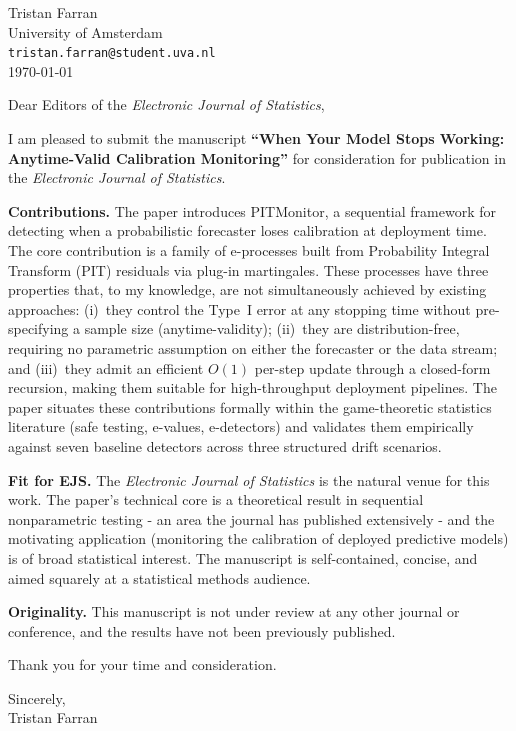 \documentclass[11pt]{article}
\begin{document}
\begin{flushright}
Tristan Farran\\
University of Amsterdam\\
\texttt{tristan.farran@student.uva.nl}\\[6pt]
\today
\end{flushright}

\bigskip

Dear Editors of the \textit{Electronic Journal of Statistics},

\bigskip

I am pleased to submit the manuscript \textbf{``When Your Model Stops Working: Anytime-Valid Calibration Monitoring''} for consideration for publication in the \textit{Electronic Journal of Statistics}.

\medskip
\textbf{Contributions.} The paper introduces PITMonitor, a sequential framework for detecting when a probabilistic forecaster loses calibration at deployment time. The core contribution is a family of e-processes built from Probability Integral Transform (PIT) residuals via plug-in martingales. These processes have three properties that, to my knowledge, are not simultaneously achieved
by existing approaches: (i)~they control the Type~I error at any stopping time without pre-specifying a sample size (anytime-validity); (ii)~they are distribution-free, requiring no parametric assumption on either the forecaster or the data stream; and (iii)~they admit an efficient $O(1)$ per-step update through a closed-form recursion, making them suitable for high-throughput deployment pipelines. The paper situates these contributions formally within the game-theoretic statistics literature (safe testing, e-values, e-detectors) and validates them empirically against seven baseline detectors across three structured drift scenarios.

\medskip
\textbf{Fit for EJS.} The \textit{Electronic Journal of Statistics} is the natural venue for this work. The paper's technical core is a theoretical result in sequential nonparametric testing - an area the journal has published extensively - and the motivating application (monitoring the calibration of deployed predictive models) is of broad statistical interest. The manuscript is self-contained, concise, and aimed squarely at a statistical methods audience.

\medskip
\textbf{Originality.} This manuscript is not under review at any other journal or conference, and the results have not been previously published.

\bigskip

Thank you for your time and consideration.

\bigskip

Sincerely,\\
Tristan Farran
\end{document}

